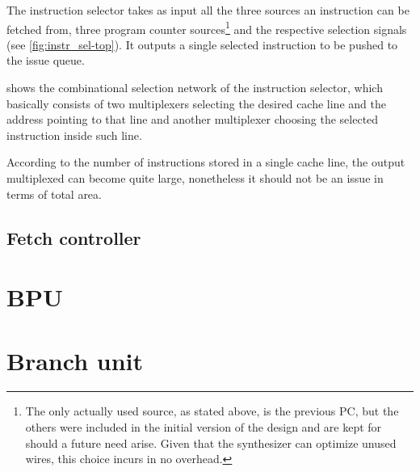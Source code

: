 The instruction selector takes as input all the three sources an instruction can be fetched from, three program counter sources\footnote{The only actually used source, as stated above, is the previous \ac{PC}, but the others were included in the initial version of the design and are kept for should a future need arise. Given that the synthesizer can optimize unused wires, this choice incurs in no overhead.} and the respective selection signals (see \cref{fig:instr_sel-top}). It outputs a single selected instruction to be pushed to the issue queue.

 shows the combinational selection network of the instruction selector, which basically consists of two multiplexers selecting the desired cache line and the address pointing to that line and another multiplexer choosing the selected instruction inside such line.

According to the number of instructions stored in a single cache line, the output multiplexed can become quite large, nonetheless it should not be an issue in terms of total area.

\subsection{Fetch controller}

\section{\acf{BPU}}

\section{Branch unit}